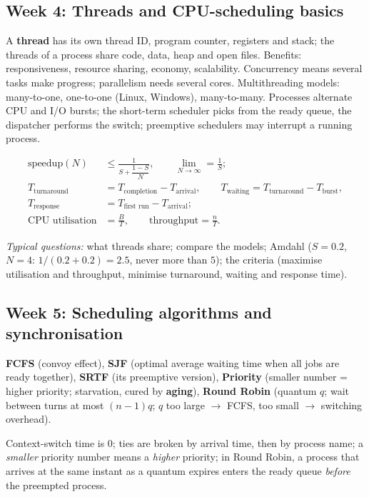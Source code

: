 \documentclass[11pt,a4paper]{article}
\newcommand{\term}[1]{\textbf{\color{mintdeep}#1}}
\begin{document}
\subsection{Week 4: Threads and CPU-scheduling basics}
A \term{thread} has its own thread ID, program counter, registers and stack; the threads of a process share code, data, heap and open files. Benefits: responsiveness, resource sharing, economy, scalability. Concurrency means several tasks make progress; parallelism needs several cores. Multithreading models: many-to-one, one-to-one (Linux, Windows), many-to-many. Processes alternate CPU and I/O bursts; the short-term scheduler picks from the ready queue, the dispatcher performs the switch; preemptive schedulers may interrupt a running process.
\begin{example}
\begin{align*}
\text{speedup}(N) &\le \frac{1}{S + \dfrac{1-S}{N}}, \qquad \lim_{N\to\infty} = \frac{1}{S};\\
T_{\text{turnaround}} &= T_{\text{completion}} - T_{\text{arrival}},\qquad
T_{\text{waiting}} = T_{\text{turnaround}} - T_{\text{burst}},\\
T_{\text{response}} &= T_{\text{first run}} - T_{\text{arrival}};\\
\text{CPU utilisation} &= \frac{B}{T}, \qquad \text{throughput} = \frac{n}{T}.
\end{align*}
\end{example}
\textit{Typical questions:} what threads share; compare the models; Amdahl ($S = 0.2$, $N = 4$: $1/(0.2+0.2) = 2.5$, never more than $5$); the criteria (maximise utilisation and throughput, minimise turnaround, waiting and response time).

\subsection{Week 5: Scheduling algorithms and synchronisation}
\textbf{FCFS} (convoy effect), \textbf{SJF} (optimal average waiting time when all jobs are ready together), \textbf{SRTF} (its preemptive version), \textbf{Priority} (smaller number = higher priority; starvation, cured by \term{aging}), \textbf{Round Robin} (quantum $q$; wait between turns at most $(n-1)q$; $q$ too large $\to$ FCFS, too small $\to$ switching overhead).

\begin{keyidea}
Context-switch time is $0$; ties are broken by arrival time, then by process name; a \emph{smaller} priority number means a \emph{higher} priority; in Round Robin, a process that arrives at the same instant as a quantum expires enters the ready queue \emph{before} the preempted process.
\end{keyidea}
\end{document}
